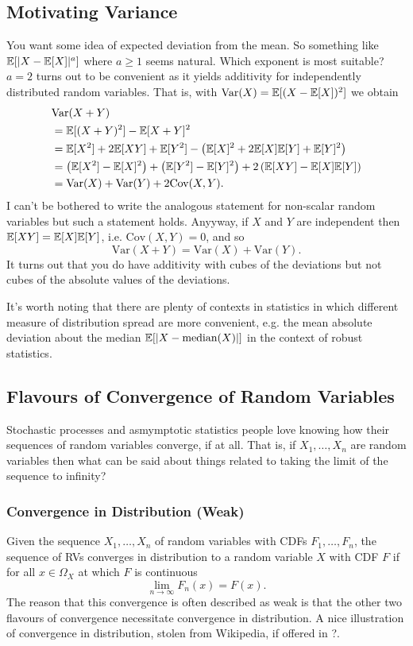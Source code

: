 \documentclass[11pt]{article}
\begin{document}
\begin{appendices}
\subsection{Motivating Variance}
You want some idea of expected deviation from the mean. So something like $\mathbb{E}[|X-\mathbb{E}[X]|^a]$ where $a\geq1$ seems natural. Which exponent is most suitable? $a=2$ turns out to be convenient as it yields additivity for independently distributed random variables. That is, with $\text{Var}(X)=\mathbb{E}[(X-\mathbb{E}[X])^2]$ we obtain
\begin{align*}
    &
    \text{Var}(X+Y)\\
    &=
    \mathbb{E}[(X+Y)^2]-\mathbb{E}[X+Y]^2\\
    &=
    \mathbb{E}[X^2]+2\mathbb{E}[XY]+\mathbb{E}[Y^2]-\left(\mathbb{E}[X]^2+2\mathbb{E}[X]\mathbb{E}[Y]+\mathbb{E}[Y]^2\right)\\
    &=
    \left(\mathbb{E}[X^2]-\mathbb{E}[X]^2\right)+\left(\mathbb{E}[Y^2]-\mathbb{E}[Y]^2\right)+2\left(\mathbb{E}[XY]-\mathbb{E}[X]\mathbb{E}[Y]\right)\\
    &=
    \text{Var}(X)+\text{Var}(Y)+2\text{Cov}(X,Y).
\end{align*}
I can't be bothered to write the analogous statement for non-scalar random variables but such a statement holds. Anyyway, if $X$ and $Y$ are independent then $\mathbb{E}[XY]=\mathbb{E}[X]\mathbb{E}[Y]$, i.e. $\text{Cov}(X,Y)=0$, and so
$$
\text{Var}(X+Y)
=
\text{Var}(X)+\text{Var}(Y).
$$
It turns out that you do have additivity with cubes of the deviations but not cubes of the absolute values of the deviations.

It's worth noting that there are plenty of contexts in statistics in which different measure of distribution spread are more convenient, e.g. the mean absolute deviation about the median $\mathbb{E}[|X-\text{median}(X)|]$ in the context of robust statistics.

\subsection{\TODO Flavours of Convergence of Random Variables}
Stochastic processes and asmymptotic statistics people love knowing how their sequences of random variables converge, if at all. That is, if $X_1,\dots,X_n$ are random variables then what can be said about things related to taking the limit of the sequence to infinity?

\subsubsection*{Convergence in Distribution (Weak)}
Given the sequence $X_1,\dots,X_n$ of random variables with CDFs $F_1,\dots,F_n$, the sequence of RVs converges in distribution to a random variable $X$ with CDF $F$ if
for all $x\in\Omega_{X}$ at which $F$ is continuous
$$
\lim_{n\to\infty}F_n(x)
=
F(x).
$$
The reason that this convergence is often described as weak is that the other two flavours of convergence necessitate convergence in distribution. A nice illustration of convergence in distribution, stolen from Wikipedia, if offered in ?.


\end{appendices}
\end{document}
